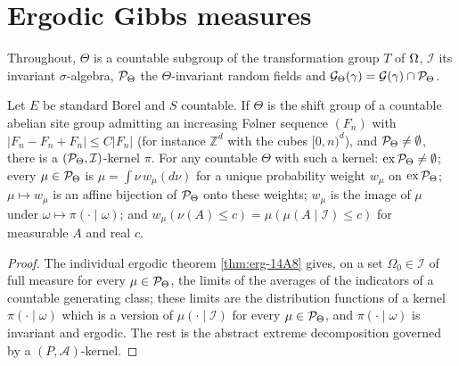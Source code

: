 \section{Ergodic Gibbs measures}

Throughout, $\Theta$ is a countable subgroup of the transformation group $T$ of $\Omega$, $\mathcal I$
its invariant $\sigma$-algebra, $\mathcal{P}_\Theta$ the $\Theta$-invariant random fields and
$\mathcal G_\Theta(\gamma) = \mathcal G(\gamma) \cap \mathcal{P}_\Theta$.

\begin{theorem}[Georgii (14.10)]
    \label{thm:erg-1410}
    \leanok

    Let $E$ be standard Borel and $S$ countable. If $\Theta$ is the shift group of a countable
    abelian site group admitting an increasing Følner sequence $(F_n)$ with
    $|F_n - F_n + F_n| \leq C |F_n|$ (for instance $\mathbb Z^d$ with the cubes $[0,n)^d$), and
    $\mathcal{P}_\Theta \neq \emptyset$, there is a $(\mathcal{P}_\Theta, \mathcal I)$-kernel $\pi$. For any
    countable $\Theta$ with such a kernel: $\operatorname{ex} \mathcal{P}_\Theta \neq \emptyset$; every
    $\mu \in \mathcal{P}_\Theta$ is $\mu = \int \nu\, w_\mu(d\nu)$ for a unique probability weight
    $w_\mu$ on $\operatorname{ex} \mathcal{P}_\Theta$; $\mu \mapsto w_\mu$ is an affine bijection of
    $\mathcal{P}_\Theta$ onto these weights; $w_\mu$ is the image of $\mu$ under
    $\omega \mapsto \pi(\cdot \mid \omega)$; and
    $w_\mu(\nu(A) \leq c) = \mu(\mu(A \mid \mathcal I) \leq c)$ for measurable $A$ and real $c$.
\end{theorem}
\begin{proof}
    \leanok
    The individual ergodic theorem \ref{thm:erg-14A8} gives, on a set $\Omega_0 \in \mathcal I$ of
    full measure for every $\mu \in \mathcal{P}_\Theta$, the limits of the averages of the indicators
    of a countable generating class; these limits are the distribution functions of a kernel
    $\pi(\cdot \mid \omega)$ which is a version of $\mu(\cdot \mid \mathcal I)$ for every
    $\mu \in \mathcal{P}_\Theta$, and $\pi(\cdot \mid \omega)$ is invariant and ergodic. The rest is the
    abstract extreme decomposition governed by a $(P, \mathcal A)$-kernel.
\end{proof}

